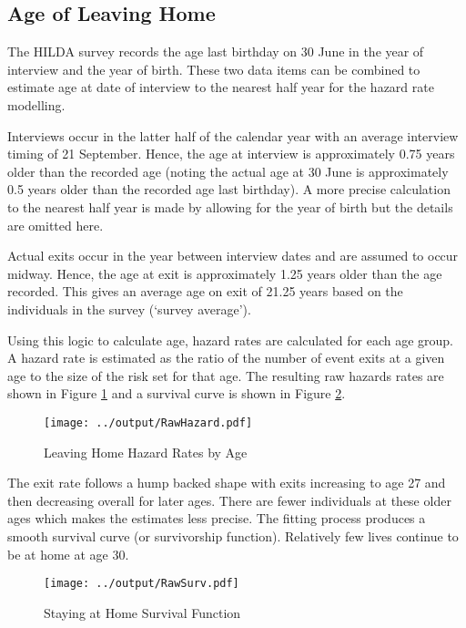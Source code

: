 \documentclass[12pt]{article}
\begin{document}


\subsection{Age of Leaving Home}

The HILDA survey records the age last birthday on 30 June in the year of interview and the year of birth. These two data items can be combined to estimate age at date of interview to the nearest half year for the hazard rate modelling.

Interviews occur in the latter half of the calendar year with an average interview timing of 21 September. Hence, the age at interview is approximately 0.75 years older than the recorded age (noting the actual age at 30 June is approximately 0.5 years older than the recorded age last birthday). A more precise calculation to the nearest half year is made by allowing for the year of birth but the details are omitted here.

Actual exits occur in the year between interview dates and are assumed to occur midway. Hence, the age at exit is approximately 1.25 years older than the age recorded. This gives an average age on exit of 21.25 years based on the individuals in the survey (`survey average').

Using this logic to calculate age, hazard rates are calculated for each age group. A hazard rate is estimated as the ratio of the number of event exits at a given age to the size of the risk set for that age. The resulting raw hazards rates are shown in Figure \ref{ExitbyAge} and a survival curve is shown in Figure \ref{StaybyAge}.

\begin{figure}[htpb]
  \caption{Leaving Home Hazard Rates by Age}
  \label{ExitbyAge}
  \centering
  \texttt{[image: ../output/RawHazard.pdf]}
\end{figure}

The exit rate follows a hump backed shape with exits increasing to age 27 and then decreasing overall for later ages. There are fewer individuals at these older ages which makes the estimates less precise. The fitting process produces a smooth survival curve (or survivorship function). Relatively few lives continue to be at home at age 30.

\begin{figure}[htpb]
  \caption{Staying at Home Survival Function}
  \label{StaybyAge}
  \centering
  \texttt{[image: ../output/RawSurv.pdf]}
\end{figure}
\end{document}
